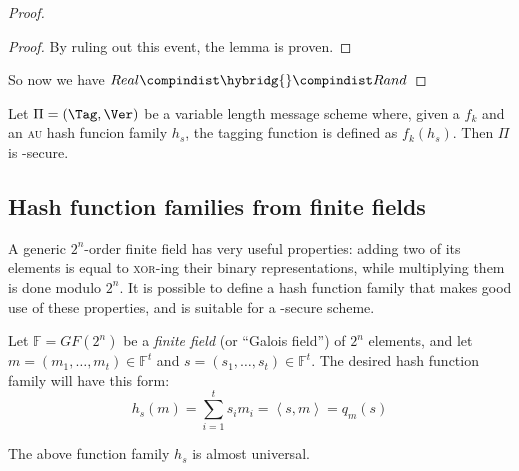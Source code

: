 \begin{proof}
\begin{proof}
        By ruling out this event, the lemma is proven.
    \end{proof}

     So now we have $Real \compindist \hybridg{} \compindist Rand$
\end{proof}

\begin{corollary}
    Let $\Pi = (\Tag, \Ver)$ be a variable length message \mac{} scheme where, given a \prf{} $f_k$ and an \textsc{au} hash funcion family $h_s$, the tagging function is defined as $f_k(h_s)$. Then $\Pi$ is \ufcma-secure.
\end{corollary}

\subsection{Hash function families from finite fields}


A generic $2^n$-order finite field has very useful properties: adding two of its elements is equal to \textsc{xor}-ing their binary representations, while multiplying them is done modulo $2^n$. It is possible to define a hash function family that makes good use of these properties, and is suitable for a \ufcma-secure \mac{} scheme.

\begin{construction}
    Let $\mathbb{F} = GF(2^n)$ be a \textit{finite field} (or ``Galois field'') of $2^n$ elements, and let $m = (m_1, \dots, m_t) \in \mathbb{F}^t$ and $s = (s_1, \dots, s_t) \in \mathbb{F}^t$. The desired hash function family will have this form:
    \[
        h_{s}(m)= \sum_{i = 1}^{t} s_i m_i = \left<s, m\right> = q_m(s)
    \]
\end{construction}

\begin{lemma}
    The above function family $h_s$ is almost universal.
\end{lemma}

